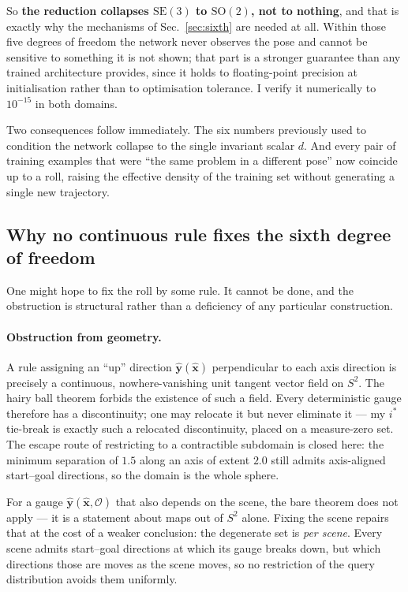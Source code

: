 \documentclass[11pt,a4paper]{article}
\newcommand{\xhat}{\hat{\mathbf{x}}}
\newcommand{\yhat}{\hat{\mathbf{y}}}
\newcommand{\SE}{\mathrm{SE}(3)}
\begin{document}
So \textbf{the reduction collapses $\SE$ to $\mathrm{SO}(2)$, not to nothing},
and that is exactly why the mechanisms of Sec.~\ref{sec:sixth} are needed at all.
Within those five degrees of freedom the network never observes the pose and
cannot be sensitive to something it is not shown; that part is a stronger
guarantee than any trained architecture provides, since it holds to
floating-point precision at initialisation rather than to optimisation tolerance.
I verify it numerically to $10^{-15}$ in both domains.

Two consequences follow immediately. The six numbers previously used to condition
the network collapse to the single invariant scalar $d$. And every pair of
training examples that were ``the same problem in a different pose'' now coincide
up to a roll, raising the effective density of the training set without
generating a single new trajectory.

\subsection{Why no continuous rule fixes the sixth degree of freedom}
\label{sec:obstructions}

One might hope to fix the roll by some rule. It cannot be done, and the
obstruction is structural rather than a deficiency of any particular
construction.

\paragraph{Obstruction from geometry.} A rule assigning an ``up'' direction
$\yhat(\xhat)$ perpendicular to each axis direction is precisely a continuous,
nowhere-vanishing unit tangent vector field on $S^2$. The hairy ball theorem
forbids the existence of such a field. Every deterministic gauge therefore has a
discontinuity; one may relocate it but never eliminate it --- my $i^\ast$
tie-break is exactly such a relocated discontinuity, placed on a measure-zero
set. The escape route of restricting to a contractible subdomain is closed here:
the minimum separation of $1.5$ along an axis of extent $2.0$ still admits
axis-aligned start--goal directions, so the domain is the whole sphere.

For a gauge $\yhat(\xhat, \mathcal{O})$ that also depends on the scene, the bare
theorem does not apply --- it is a statement about maps out of $S^2$ alone.
Fixing the scene repairs that at the cost of a weaker conclusion: the degenerate
set is \emph{per scene}. Every scene admits start--goal directions at which its
gauge breaks down, but which directions those are moves as the scene moves, so no
restriction of the query distribution avoids them uniformly.
\end{document}
